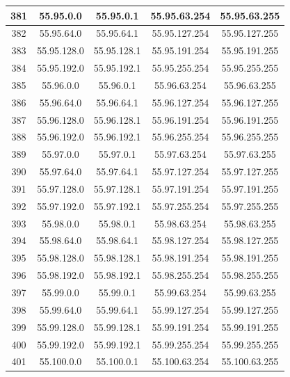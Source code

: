 \documentclass[letterpaper,12pt]{article}
\begin{document}
\begin{center}
\begin{longtable}{|c|c|c|c|c|}
                381 & 55.95.0.0 & 55.95.0.1 & 55.95.63.254 & 55.95.63.255 \\ \hline
                382 & 55.95.64.0 & 55.95.64.1 & 55.95.127.254 & 55.95.127.255 \\ \hline
                383 & 55.95.128.0 & 55.95.128.1 & 55.95.191.254 & 55.95.191.255 \\ \hline
                384 & 55.95.192.0 & 55.95.192.1 & 55.95.255.254 & 55.95.255.255 \\ \hline
                385 & 55.96.0.0 & 55.96.0.1 & 55.96.63.254 & 55.96.63.255 \\ \hline
                386 & 55.96.64.0 & 55.96.64.1 & 55.96.127.254 & 55.96.127.255 \\ \hline
                387 & 55.96.128.0 & 55.96.128.1 & 55.96.191.254 & 55.96.191.255 \\ \hline
                388 & 55.96.192.0 & 55.96.192.1 & 55.96.255.254 & 55.96.255.255 \\ \hline
                389 & 55.97.0.0 & 55.97.0.1 & 55.97.63.254 & 55.97.63.255 \\ \hline
                390 & 55.97.64.0 & 55.97.64.1 & 55.97.127.254 & 55.97.127.255 \\ \hline
                391 & 55.97.128.0 & 55.97.128.1 & 55.97.191.254 & 55.97.191.255 \\ \hline
                392 & 55.97.192.0 & 55.97.192.1 & 55.97.255.254 & 55.97.255.255 \\ \hline
                393 & 55.98.0.0 & 55.98.0.1 & 55.98.63.254 & 55.98.63.255 \\ \hline
                394 & 55.98.64.0 & 55.98.64.1 & 55.98.127.254 & 55.98.127.255 \\ \hline
                395 & 55.98.128.0 & 55.98.128.1 & 55.98.191.254 & 55.98.191.255 \\ \hline
                396 & 55.98.192.0 & 55.98.192.1 & 55.98.255.254 & 55.98.255.255 \\ \hline
                397 & 55.99.0.0 & 55.99.0.1 & 55.99.63.254 & 55.99.63.255 \\ \hline
                398 & 55.99.64.0 & 55.99.64.1 & 55.99.127.254 & 55.99.127.255 \\ \hline
                399 & 55.99.128.0 & 55.99.128.1 & 55.99.191.254 & 55.99.191.255 \\ \hline
                400 & 55.99.192.0 & 55.99.192.1 & 55.99.255.254 & 55.99.255.255 \\ \hline
                401 & 55.100.0.0 & 55.100.0.1 & 55.100.63.254 & 55.100.63.255 \\ \hline

\end{longtable}
\end{center}
\end{document}
